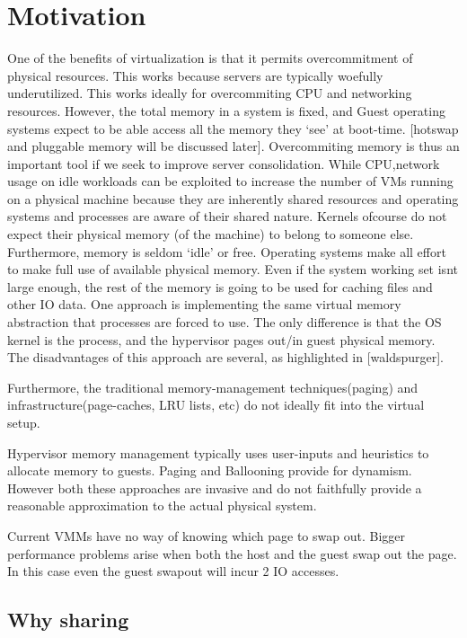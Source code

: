 \documentclass[11pt]{article}
\begin{document}
\section{Motivation}
\label{sec-3}

One of the benefits of virtualization is that it permits overcommitment of physical resources. This works because servers are typically woefully underutilized. This works ideally for overcommiting CPU and networking resources. However, the total memory in a system is fixed, and Guest operating systems expect to be able access all the memory they `see' at boot-time. [hotswap and pluggable memory will be discussed later].
Overcommiting memory is thus an important tool if we seek to improve server consolidation. 
While CPU,network usage on idle workloads can be exploited to increase the number of VMs running on a physical machine because they are inherently shared resources and operating systems and processes are aware of their shared nature. Kernels ofcourse do not expect their physical memory (of the machine) to belong to someone else. 
Furthermore, memory is seldom `idle' or free. Operating systems make all effort to make full use of available physical memory. Even if the system working set isnt large enough, the rest of the memory is going to be used for caching files and other IO data. 
One approach is implementing the same virtual memory abstraction that processes are forced to use. 
The only difference is that the OS kernel is the process, and the hypervisor pages out/in guest physical memory. The disadvantages of this approach are several, as highlighted in [waldspurger].

Furthermore, the traditional memory-management techniques(paging) and infrastructure(page-caches, LRU lists, etc) do not ideally fit into the virtual setup. 

Hypervisor memory management typically uses user-inputs and heuristics to allocate memory to guests. Paging and Ballooning provide for dynamism. However both these approaches are invasive and do not faithfully provide a reasonable approximation to the actual physical system.

Current VMMs have no way of knowing which page to swap out. Bigger performance problems arise when both the host and the guest swap out the page. In this case even the guest swapout will incur 2 IO accesses.
  
\subsection{Why sharing}
\label{sec-3_1}
\end{document}
